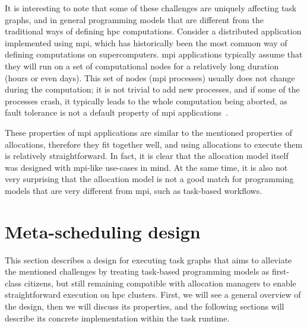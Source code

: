 It is interesting to note that some of these challenges are uniquely affecting task graphs, and in
general programming models that are different from the traditional ways of defining
\gls{hpc} computations. Consider a distributed application implemented using
\gls{mpi}, which has historically been the most common way of defining computations on
supercomputers. \gls{mpi} applications typically assume that they will run on a set of
computational nodes for a relatively long duration (hours or even days). This set of nodes
(\gls{mpi} processes) usually does not change during the computation; it is not
trivial to add new processes, and if some of the processes crash, it typically leads to the whole
computation being aborted, as fault tolerance is not a default property of \gls{mpi}
applications~\cite{fault_tolerant_mpi}.

These properties of \gls{mpi} applications are similar to the mentioned properties of
allocations, therefore they fit together well, and using allocations to execute them is
relatively straightforward. In fact, it is clear that the allocation model itself was designed with
\gls{mpi}-like use-cases in mind. At the same time, it is also not very surprising
that the allocation model is not a good match for programming models that are very different from
\gls{mpi}, such as task-based workflows.



\section{Meta-scheduling design}
This section describes a design for executing task graphs that aims to alleviate the mentioned
challenges by treating task-based programming models as first-class citizens, but still remaining
compatible with allocation managers to enable straightforward execution on \gls{hpc}
clusters. First, we will see a general overview of the design, then we will discuss its properties,
and the following sections will describe its concrete implementation within the
\hyperqueue{} task runtime.


